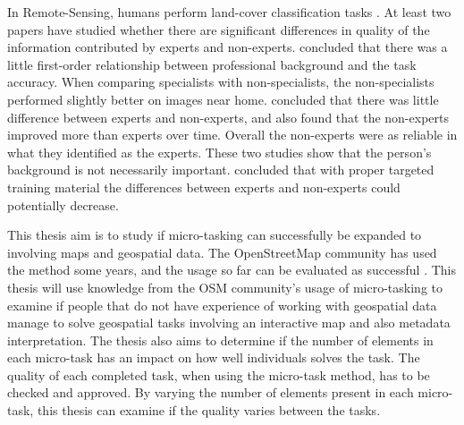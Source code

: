 In Remote-Sensing, humans perform land-cover classification tasks \citep{Salk2016}. At least two papers have studied whether there are significant differences in quality of the information contributed by experts and non-experts.
\cite{Salk2016} concluded that there was a little first-order relationship between professional background and the task accuracy.
When comparing specialists with non-specialists, the non-specialists performed slightly better on images near home. 
\cite{See2013} concluded that there was little difference between experts and non-experts, and also found that the non-experts improved more than experts over time. Overall the non-experts were as reliable in what they identified as the experts. These two studies show that the person's background is not necessarily important. \cite{See2013} concluded that with proper targeted training material the differences between experts and non-experts could potentially decrease.   

This thesis aim is to study if micro-tasking can successfully be expanded to involving maps and geospatial data. The OpenStreetMap community has used the method some years, and the usage so far can be evaluated as successful \citep{Erichsen2016}. This thesis will use knowledge from the OSM community's usage of micro-tasking to examine if people that do not have experience of working with geospatial data manage to solve geospatial tasks involving an interactive map and also metadata interpretation. The thesis also aims to determine if the number of elements in each micro-task has an impact on how well individuals solves the task. The quality of each completed task, when using the micro-task method, has to be checked and approved. By varying the number of elements present in each micro-task, this thesis can examine if the quality varies between the tasks. 


